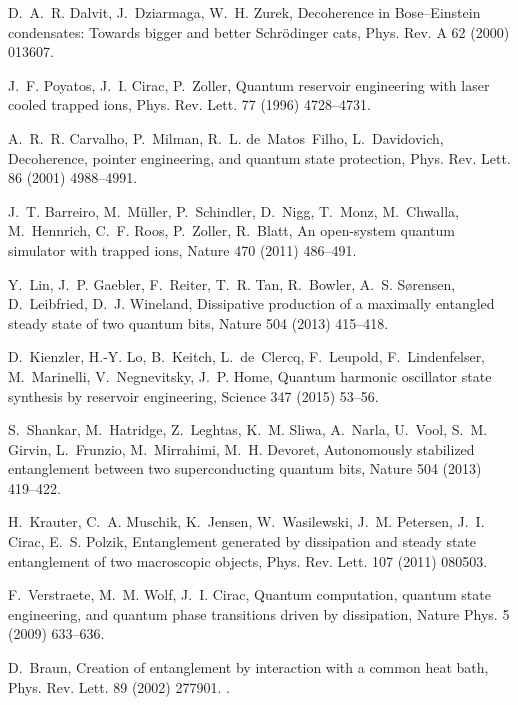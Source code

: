 \documentclass[3p,sort&compress,12pt]{elsarticle}
\begin{document}
\begin{thebibliography}{100}
D.~A.~R. Dalvit, J.~Dziarmaga, W.~H. Zurek, Decoherence in {B}ose--{E}instein
  condensates: Towards bigger and better {S}chr{\"o}dinger cats, Phys. Rev. A
  62 (2000) 013607.

J.~F. Poyatos, J.~I. Cirac, P.~Zoller, Quantum reservoir engineering with laser
  cooled trapped ions, Phys. Rev. Lett. 77 (1996) 4728--4731.

A.~R.~R. Carvalho, P.~Milman, R.~L. de~Matos~Filho, L.~Davidovich, Decoherence,
  pointer engineering, and quantum state protection, Phys. Rev. Lett. 86 (2001)
  4988--4991.

J.~T. Barreiro, M.~M{\"u}ller, P.~Schindler, D.~Nigg, T.~Monz, M.~Chwalla,
  M.~Hennrich, C.~F. Roos, P.~Zoller, R.~Blatt, An open-system quantum
  simulator with trapped ions, Nature 470 (2011) 486--491.

Y.~Lin, J.~P. Gaebler, F.~Reiter, T.~R. Tan, R.~Bowler, A.~S. S{\o}rensen,
  D.~Leibfried, D.~J. Wineland, Dissipative production of a maximally entangled
  steady state of two quantum bits, Nature 504 (2013) 415--418.

D.~Kienzler, H.-Y. Lo, B.~Keitch, L.~de~Clercq, F.~Leupold, F.~Lindenfelser,
  M.~Marinelli, V.~Negnevitsky, J.~P. Home, Quantum harmonic oscillator state
  synthesis by reservoir engineering, Science 347 (2015) 53--56.

S.~Shankar, M.~Hatridge, Z.~Leghtas, K.~M. Sliwa, A.~Narla, U.~Vool, S.~M.
  Girvin, L.~Frunzio, M.~Mirrahimi, M.~H. Devoret, Autonomously stabilized
  entanglement between two superconducting quantum bits, Nature 504 (2013)
  419--422.

H.~Krauter, C.~A. Muschik, K.~Jensen, W.~Wasilewski, J.~M. Petersen, J.~I.
  Cirac, E.~S. Polzik, Entanglement generated by dissipation and steady state
  entanglement of two macroscopic objects, Phys. Rev. Lett. 107 (2011) 080503.

F.~Verstraete, M.~M. Wolf, J.~I. Cirac, Quantum computation, quantum state
  engineering, and quantum phase transitions driven by dissipation, Nature
  Phys. 5 (2009) 633--636.

D.~Braun, Creation of entanglement by interaction with a common heat bath,
  Phys. Rev. Lett. 89 (2002) 277901.
\newblock \href {http://dx.doi.org/10.1103/PhysRevLett.89.277901}
  {}.


\end{thebibliography}
\end{document}
